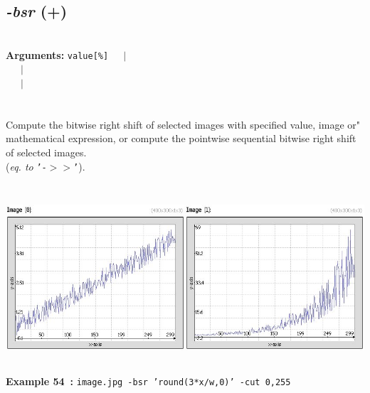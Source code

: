 \documentclass[a4paper,11pt,twoside]{book}
\begin{document}
\subsection{\emph{-bsr} (+)}\vspace*{-0.5em}
~\\\textbf{Arguments: } 
{\small \texttt{value[\%]}}~~~$|$\\
\hspace*{2.2cm}{\small \texttt{[image]}}~~~$|$\\
~~~$|$\\
\\~\\
Compute the bitwise right shift of selected images with specified value, image or"
mathematical expression, or compute the pointwise sequential bitwise right shift of
selected images.
~\\(\emph{eq. to} {\small \texttt{'-$>$$>$'}}).
\begin{center}\includegraphics[keepaspectratio=true,height=7cm,width=\textwidth]{img/gmic_def54.jpg}\\
{\footnotesize \textbf{Example 54~:} \texttt{image.jpg -bsr 'round(3*x/w,0)' -cut 0,255}}
\end{center}
\end{document}
